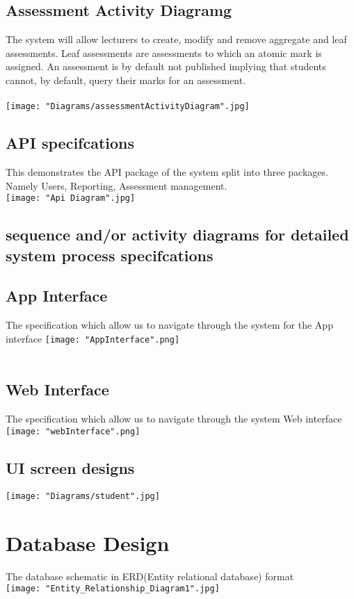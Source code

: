 \documentclass[10pt,a4paper]{article}
\begin{document}
\pagebreak
\subsection*{Assessment Activity Diagramg}
The system will allow lecturers to create, modify and remove aggregate and leaf assessments. 
Leaf assessments are assessments to which an atomic mark is assigned. An
assessment is by default not published implying that students cannot, by default, query their marks
for an assessment.\\\\
\texttt{[image: "Diagrams/assessmentActivityDiagram".jpg]}\\

\pagebreak
\subsection{API specifcations}
This demonstrates the API package of the system split into three packages. Namely Users, Reporting, Assessment management.\\
\texttt{[image: "Api Diagram".jpg]}

\subsection{sequence and/or activity diagrams for detailed system process specifcations}

\subsection*{App Interface}
The specification which allow us to navigate through the system for the App interface
\texttt{[image: "AppInterface".png]}\\\\

\subsection*{Web Interface}
The specification which allow us to navigate through the system Web interface
\texttt{[image: "webInterface".png]}\\

\subsection{UI screen designs}
\texttt{[image: "Diagrams/student".jpg]}

\section{Database Design}
The database schematic in ERD(Entity relational database) format\\
\texttt{[image: "Entity\_Relationship\_Diagram1".jpg]}
\end{document}
